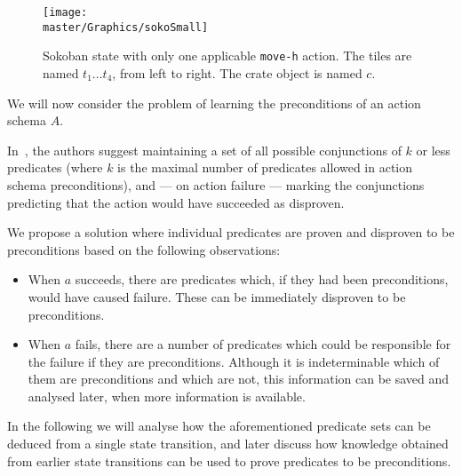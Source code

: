 \documentclass[../Master.tex]{subfiles}
\providecommand{\master}{..}
\begin{document}
\begin{figure}
    \centering
    \texttt{[image: \\master/Graphics/sokoSmall]}
    \caption{\label{fig:sokoSmall} Sokoban state with only one applicable \texttt{move-h} action. The tiles are named $t_1 \dots t_4$, from left to right. The crate object is named $c$.}
\end{figure}

We will now consider the problem of learning the preconditions of an action schema $A$.

In~\cite{Walsh2008}, the authors suggest maintaining a set of all possible conjunctions of $k$ or less predicates (where $k$ is the maximal number of predicates allowed in action schema preconditions), and --- on action failure --- marking the conjunctions predicting that the action would have succeeded as disproven.

We propose a solution where individual predicates are proven and disproven to be preconditions based on the following observations:
\begin{itemize}
    \item When $a$ succeeds, there are predicates which, if they had been preconditions, would have caused failure. These can be immediately disproven to be preconditions.
    \item When $a$ fails, there are a number of predicates which could be responsible for the failure if they are preconditions. Although it is indeterminable which of them are preconditions and which are not, this information can be saved and analysed later, when more information is available.
\end{itemize}

In the following we will analyse how the aforementioned predicate sets can be deduced from a single state transition, and later discuss how knowledge obtained from earlier state transitions can be used to prove predicates to be preconditions.
\end{document}

